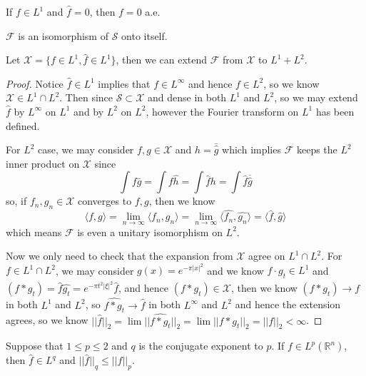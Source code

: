 \documentclass[lang=en, color=blue, ]{elegantbook}
\newcommand{\F}{\mathcal{F}}
\newcommand{\R}{\mathbb{R}}
\newcommand{\Sch}{\mathcal{S}}
\begin{document}
\begin{corollary}
    If $f\in L^1$ and $\hat{f} = 0$, then $f=0$ a.e.
\end{corollary}

\begin{corollary}
    $\F$ is an isomorphism of $\Sch$ onto itself.
\end{corollary}

\begin{theorem}
    Let $\mathcal{X} = \{f\in L^1, \hat{f} \in L^1\}$, then we can extend $\F$ from $\mathcal{X}$ to $L^1 + L^2$.
\end{theorem}
\begin{proof}\par
    Notice $\hat{f}\in L^1$ implies that $f\in L^{\infty}$ and hence $f\in L^2$, so we know $\mathcal{X}\in L^1\cap L^2$. Then since $\Sch \subset \mathcal{X}$ and dense in both $L^1$ and $L^2$, so we may extend $\hat{f}$ by $L^{\infty}$ on $L^1$ and by $L^2$ on $L^2$, however the Fourier transform on $L^1$ has been defined.\par
    For $L^2$ case, we may consider $f,g\in\mathcal{X}$ and $h = \bar{\hat{g}}$ which implies $\F$ keeps the $L^2$ inner product on $\mathcal{X}$ since
    \[
    \int f\bar{g} = \int f\hat{h} = \int \hat{f}h = \int \hat{f}\overline{\hat{g}}
    \]
    so, if $f_n,g_n \in \mathcal{X}$ converges to $f,g$, then we know
    \[
    \langle f,g\rangle = \lim_{n\to\infty} \langle f_n,g_n\rangle = \lim_{n\to\infty}\langle \hat{f_n},\hat{g_n}\rangle = \langle \hat{f},\hat{g}\rangle
    \]
    which means $\F$ is even a unitary isomorphism on $L^2$.\par
    Now we only need to check that the expansion from $\mathcal{X}$ agree on $L^1\cap L^2$. For $f\in L^1 \cap L^2$, we may consider $g(x) = e^{-\pi|x|^2}$ and we know $f\cdot g_t \in L^1$ and $\hat{(f*g_t)} = \hat{f}\hat{g_t} = e^{-\pi t^2|\xi|^2}\hat{f}$, and hence $(f*g_t) \in \mathcal{X}$, then we know $(f*g_t) \to f$ in both $L^1$ and $L^2$, so $\hat{f*g_t} \to \hat{f}$ in both $L^{\infty}$ and $L^2$ and hence the extension agrees, so we know $||\hat{f}||_2 = \lim||\hat{f*g_t}||_2 = \lim||f*g_t||_2 = ||f||_2 < \infty$.
\end{proof}

\begin{theorem}
    Suppose that $1\leq p\leq 2$ and $q$ is the conjugate exponent to $p$. If $f\in L^p(\R^n)$, then $\hat{f}\in L^q$ and $||\hat{f}||_q \leq ||f||_p$.
\end{theorem}
\end{document}

